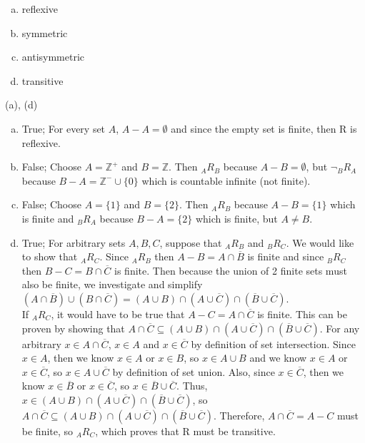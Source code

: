 \vspace{2cm}
\begin{enumerate}[(a)]
	\item  reflexive
    
	\item  symmetric
    
	\item  antisymmetric
    
	\item  transitive

\end{enumerate}
\begin{solution}

(a), (d)\\
\begin{enumerate}[a)]
    \item True; For every set $A$, $A - A = \emptyset$ and since the empty set is finite, then R is reflexive.
    \item False; Choose $A = \mathbb{Z^+}$ and $B = \mathbb{Z}$. Then ${}_A R_B$ because $A - B = \emptyset$, but $\neg {}_B R_A$ because $B - A = \mathbb{Z^-} \cup \{0\}$ which is countable infinite (not finite).
    \item False; Choose $A = \{1\}$ and $B = \{2\}$. Then ${}_A R_B$ because $A - B = \{1\}$ which is finite and ${}_B R_A$ because $B - A = \{2\}$ which is finite, but $A \neq B$.
    \item True; For arbitrary sets $A, B, C$, suppose that ${}_A R_B$ and ${}_B R_C$. We would like to show that ${}_A R_C$. Since ${}_A R_B$ then $A - B = A \cap \overline{B}$ is finite and since ${}_B R_C$ then $B - C = B \cap \overline{C}$ is finite. Then because the union of 2 finite sets must also be finite, we investigate and simplify $(A \cap \overline{B}) \cup (B \cap \overline{C}) = (A \cup B) \cap (A \cup \overline{C}) \cap (\overline{B} \cup \overline{C})$.\\
    If ${}_A R_C$, it would have to be true that $A - C = A \cap \overline{C}$ is finite. This can be proven by showing that $A \cap \overline{C} \subseteq (A \cup B) \cap (A \cup \overline{C}) \cap (\overline{B} \cup \overline{C})$. For any arbitrary $x \in A \cap \overline{C}$, $x \in A$ and $x \in \overline{C}$ by definition of set intersection. Since $x \in A$, then we know $x \in A$ or $x \in B$, so $x \in A \cup B$ and we know $x \in A$ or $x \in \overline{C}$, so $x \in A \cup \overline{C}$ by definition of set union. Also, since $x \in \overline{C}$, then we know $x \in \overline{B}$ or $x \in \overline{C}$, so $x \in \overline{B} \cup \overline{C}$. Thus, $x \in (A \cup B) \cap (A \cup \overline{C}) \cap (\overline{B} \cup \overline{C})$, so $A \cap \overline{C} \subseteq (A \cup B) \cap (A \cup \overline{C}) \cap (\overline{B} \cup \overline{C})$. Therefore, $A \cap \overline{C} = A - C$ must be finite, so ${}_A R_C$, which proves that R must be transitive.
\end{enumerate}

\end{solution}


